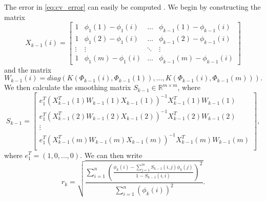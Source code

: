 \documentclass[3p]{elsarticle}
\begin{document}
The error in \eqref{eq:cv_error} can easily be computed \cite{wasserman2006all}.
%
We begin by constructing the matrix
\begin{equation}
X_{k-1}(i) = \begin{bmatrix}
1 & \phi_1(1) - \phi_1(i) & \dots & \phi_{k-1}(1)- \phi_{k-1}(i) \\
1 & \phi_1(2) - \phi_1(i) & \dots & \phi_{k-1}(2)- \phi_{k-1}(i) \\
\vdots & \vdots & \ddots & \vdots \\
1 & \phi_1(m) - \phi_1(i) & \dots & \phi_{k-1}(m)- \phi_{k-1}(i) 
\end{bmatrix}
\end{equation}
%
and the matrix 
\begin{equation}
W_{k-1}(i) = diag \left( K(\Phi_{k-1}(i), \Phi_{k-1}(1)), \dots, K(\Phi_{k-1}(i), \Phi_{k-1}(m)) \right).
\end{equation}
%
We then calculate the smoothing matrix $S_{k-1} \in \mathbb{R}^{m \times m}$, where 
\begin{equation}
S_{k-1} =
\begin{bmatrix}
e_1^T \left( X_{k-1}^T(1) W_{k-1}(1) X_{k-1}(1) \right) ^{-1} X_{k-1}^T(1) W_{k-1}(1) \\
e_1^T \left( X_{k-1}^T(2) W_{k-1}(2) X_{k-1}(2) \right) ^{-1} X_{k-1}^T(2) W_{k-1}(2) \\
\vdots \\
e_1^T \left( X_{k-1}^T(m) W_{k-1}(m) X_{k-1}(m) \right) ^{-1} X_{k-1}^T(m) W_{k-1}(m) \\
\end{bmatrix},
\end{equation}
%
where $e_1^T = (1, 0, \dots, 0)$. 
%
We can then write
%
\begin{equation} 
r_{k} = \sqrt{ \frac{\sum_{i=1}^n \left( \frac{ \phi_{k} (i) - \sum_{j=1}^m S_{k-1}(i,j) \phi_{k}(j) }{1-S_{k-1}(i,i)} \right)^2} {\sum_{i=1}^n  \left( \phi_{k} (i) \right)^2 }} .
\end{equation}
\end{document}
